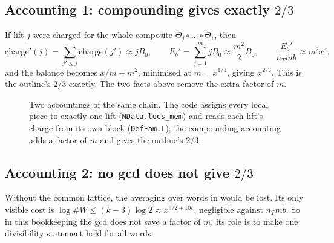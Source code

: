 \documentclass[11pt]{article}
\newcommand{\eps}{\varepsilon}
\theoremstyle{plain}
\theoremstyle{definition}
\begin{document}
\subsection{Accounting 1: compounding gives exactly $2/3$}

If lift $j$ were charged for the whole composite $\Theta_j\circ\dots\circ\Theta_1$, then
\[
\mathrm{charge}'(j)=\sum_{j'\le j}\mathrm{charge}(j')\approx jB_0,\qquad
E_b'=\sum_{j=1}^m jB_0\approx\frac{m^2}{2}B_0,\qquad \frac{E_b'}{n_Tmb}\approx m^2x^\eps,
\]
and the balance becomes $x/m+m^2$, minimised at $m=x^{1/3}$, giving $x^{2/3}$. This is the outline's
$2/3$ exactly. The two facts above remove the extra factor of $m$.

\begin{figure}[ht]
\centering
{}
\caption{Two accountings of the same chain. The code assigns every local piece to exactly one lift
(\texttt{NData.locs\_mem}) and reads each lift's charge from its own block (\texttt{DefFam.L}); the
compounding accounting adds a factor of $m$ and gives the outline's $2/3$.}\label{fig:compound}
\end{figure}



\subsection{Accounting 2: no gcd does not give $2/3$}

Without the common lattice, the averaging over words in  would be lost. Its only
visible cost is $\log\#W\le(k-3)\log2\approx x^{9/2+10\eps}$, negligible against $n_Tmb$. So in this
bookkeeping the gcd does not save a factor of $m$; its role is to make one divisibility statement
hold for all words.
\end{document}
